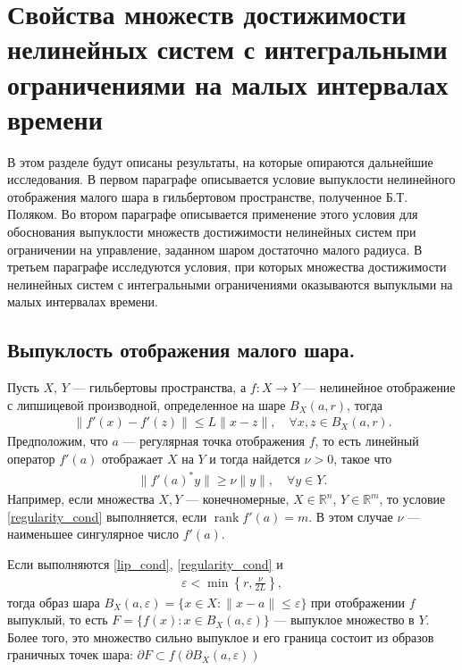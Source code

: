 \documentclass[../main.tex]{subfiles}
\begin{document}
\clearpage
\section{Свойства множеств достижимости нелинейных систем с интегральными ограничениями на малых интервалах времени}
    В этом разделе будут описаны результаты, на которые опираются дальнейшие исследования. 
	В первом параграфе описывается условие выпуклости нелинейного отображения малого шара в гильбертовом пространстве, полученное  Б.Т. Поляком\cite{Polyak2001}.
	Во втором параграфе описывается применение этого условия для обоснования выпуклости множеств достижимости нелинейных систем при ограничении на управление, заданном шаром достаточно малого радиуса.
	В третьем параграфе исследуются условия, при которых множества достижимости нелинейных систем с интегральными ограничениями оказываются выпуклыми на малых интервалах времени. 
    
    \subsection{Выпуклость отображения малого шара.}
    
    Пусть $X$, $Y$ --- гильбертовы пространства, а $f: X \rightarrow Y$ --- нелинейное отображение с липшицевой производной, определенное  на шаре $B_X(a,r) $, тогда 
    \begin{gather}\label{lip_cond}
        \| f'(x) - f'(z) \| \leqslant L \| x - z \|, \quad \forall x,z \in B_X(a,r).
    \end{gather}
    Предположим, что $a$ --- регулярная точка отображения $f$, то есть линейный оператор $f'(a)$ отображает $X$ на $Y$ и тогда найдется $\nu > 0$, такое что
    \begin{gather}\label{regularity_cond}
        \| f'(a)^*y\| \geqslant \nu \| y\|, \quad \forall y \in Y.
    \end{gather}
    Например, если множества $X,Y$ --- конечномерные, $X\in\mathbb{R}^n$, $Y\in\mathbb{R}^m$, то условие \eqref{regularity_cond} выполняется, если $ \operatorname{rank} f'(a) = m$. В этом случае $\nu$ --- наименьшее сингулярное число $f'(a)$. 
    \begin{theorem}\label{PolyakTh}
        Если выполняются \eqref{lip_cond}, \eqref{regularity_cond}  и 
        \begin{gather}
            \varepsilon < \min\left\{r,\frac{\nu}{2L}\right\},
        \end{gather}
        тогда образ шара $B_X(a,\varepsilon) = \{x \in X: \| x - a\| \leqslant \varepsilon\}$ при отображении $f$ выпуклый, то есть $F = 
        \{f(x): x \in B_X(a,\varepsilon)\}$ --- выпуклое множество в $Y$. Более того, это множество сильно выпуклое и его граница состоит из образов граничных точек шара: $\partial F \subset f(\partial B_X(a,\varepsilon))$
    \end{theorem}
    
\end{document}
